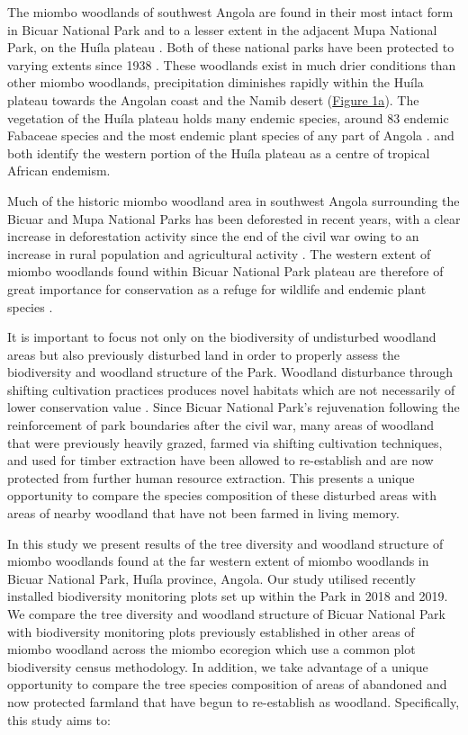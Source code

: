 \begin{refsection}
The miombo woodlands of southwest Angola are found in their most intact form in Bicuar National Park and to a lesser extent in the adjacent Mupa National Park, on the Hu\'{i}la plateau \citep{Chisingui2018}. Both of these national parks have been protected to varying extents since 1938 \cite{Huntley2019}. These woodlands exist in much drier conditions than other miombo woodlands, precipitation diminishes rapidly within the Hu\'{i}la plateau towards the Angolan coast and the Namib desert (\hyperref[plot_map]{Figure 1a}). The vegetation of the Hu\'{i}la plateau holds many endemic species, around 83 endemic Fabaceae species \citep{Soares2007} and the most endemic plant species of any part of Angola \citep{Figueiredo2008}. \citet{Linder2001} and \citet{Droissart2018} both identify the western portion of the Hu\'{i}la plateau as a centre of tropical African endemism.

Much of the historic miombo woodland area in southwest Angola surrounding the Bicuar and Mupa National Parks has been deforested in recent years, with a clear increase in deforestation activity since the end of the civil war owing to an increase in rural population and agricultural activity \citep{Schneibel2013, Huntley2019}. The western extent of miombo woodlands found within Bicuar National Park plateau are therefore of great importance for conservation as a refuge for wildlife and endemic plant species \citep{Huntley2019}.

It is important to focus not only on the biodiversity of undisturbed woodland areas but also previously disturbed land in order to properly assess the biodiversity and woodland structure of the Park. Woodland disturbance through shifting cultivation practices produces novel habitats which are not necessarily of lower conservation value \citep{McNicol2015a, Goncalves2017}. Since Bicuar National Park's rejuvenation following the reinforcement of park boundaries after the civil war, many areas of woodland that were previously heavily grazed, farmed via shifting cultivation techniques, and used for timber extraction have been allowed to re-establish and are now protected from further human resource extraction. This presents a unique opportunity to compare the species composition of these disturbed areas with areas of nearby woodland that have not been farmed in living memory.

In this study we present results of the tree diversity and woodland structure of miombo woodlands found at the far western extent of miombo woodlands in Bicuar National Park, Hu\'{i}la province, Angola. Our study utilised recently installed biodiversity monitoring plots set up within the Park in 2018 and 2019. We compare the tree diversity and woodland structure of Bicuar National Park with biodiversity monitoring plots previously established in other areas of miombo woodland across the miombo ecoregion which use a common plot biodiversity census methodology. In addition, we take advantage of a unique opportunity to compare the tree species composition of areas of abandoned and now protected farmland that have begun to re-establish as woodland. Specifically, this study aims to:


\end{refsection}
